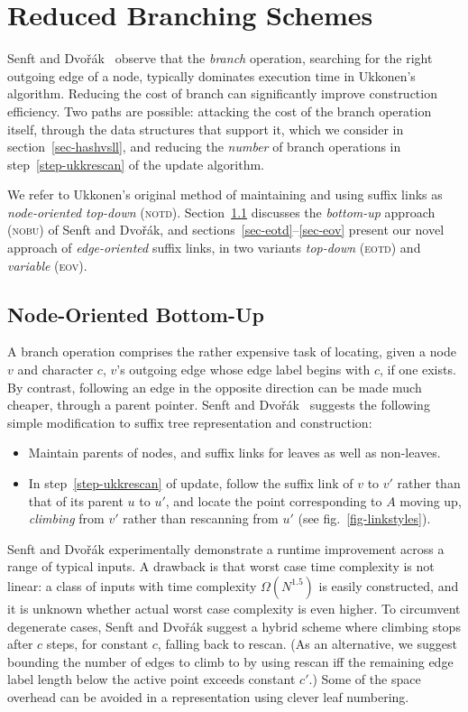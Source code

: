 \documentclass{llncs}
\newcommand\notd{\textsc{notd}\xspace}
\newcommand\nobu{\textsc{nobu}\xspace}
\newcommand\eotd{\textsc{eotd}\xspace}
\newcommand\eov{\textsc{eov}\xspace}
\begin{document}
\section{Reduced Branching Schemes}\label{sec-redbranch}

Senft and Dvořák~\cite{SenftBranching} observe that the \emph{branch} operation,
searching for the right outgoing edge of a node, typically dominates execution
time in Ukkonen's algorithm. Reducing the cost of branch can significantly improve
construction efficiency. Two paths are possible: attacking the cost of the
branch operation itself, through the data structures that support it, which
we consider in section~\ref{sec-hashvsll}, and reducing the \emph{number}
of branch operations in step~\ref{step-ukkrescan} of
the update algorithm.

We refer to Ukkonen's original method of maintaining and using suffix links as
\emph{node-oriented top-down} (\notd). Section~\ref{sec-nobu} discusses the
\emph{bottom-up} approach (\nobu) of Senft and Dvořák, and
sections~\ref{sec-eotd}--\ref{sec-eov} present our novel approach of
\emph{edge-oriented} suffix links, in two variants \emph{top-down} (\eotd) and
\emph{variable} (\eov).

\subsection{Node-Oriented Bottom-Up}\label{sec-nobu}

A branch operation comprises the rather expensive task of locating, given a
node $v$ and character $c$, $v$'s outgoing
edge whose edge label begins with $c$, if one exists. By contrast, following an
edge in the opposite direction can be made much cheaper, through a parent pointer. Senft and Dvořák~\cite{SenftBranching}
suggests the following simple modification to suffix tree representation and
construction:
\begin{itemize}
\item Maintain parents of nodes, and suffix links for
  leaves as well as non-leaves.
\item In step~\ref{step-ukkrescan} of
update, follow the suffix link of $v$ to $v'$ rather than that of its
parent $u$ to $u'$, and locate the point corresponding to $A$ moving up,
\emph{climbing} from $v'$
rather than rescanning from $u'$ (see fig.~\ref{fig-linkstyles}).
\end{itemize}

Senft and Dvořák experimentally demonstrate a runtime improvement across a
range of typical inputs. A drawback is that worst case time complexity is
not linear: a class of inputs with time complexity $\Omega(N^{1.5})$ is
easily constructed, and it is unknown whether actual worst case
complexity is even higher. To circumvent degenerate cases, Senft and Dvořák
suggest a hybrid scheme where climbing stops after $c$ steps, for constant $c$, falling back to rescan. (As an alternative, we
suggest bounding the number of edges to climb to by using rescan iff the remaining edge label length below the active point
exceeds constant $c'$.) Some of the space overhead can be avoided in a representation using clever
leaf numbering.
\end{document}
